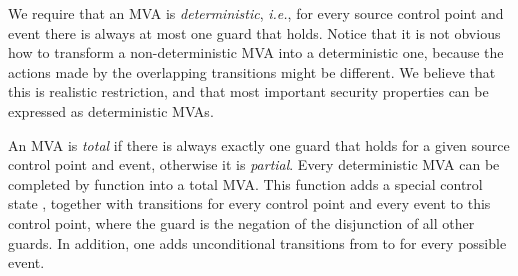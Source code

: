 We require that an MVA is \emph{deterministic}, \emph{i.e.}, for every
source control point and event there is always at most one guard that
holds. Notice that it is not obvious how to transform a
non-deterministic MVA into a deterministic one, because the actions
made by the overlapping transitions might be different. We believe
that this is realistic restriction, and that most important security
properties can be expressed as deterministic MVAs.

An MVA is \emph{total} if there is always exactly one guard that holds
for a given source control point and event, otherwise it is
\emph{partial}. Every deterministic MVA can be completed by function
\complete into a total
MVA. This function adds a special control state
\halted, together with transitions for every control point and every event
to this \halted control point, where the guard is the negation of the
disjunction of all other guards. In addition, one adds unconditional
transitions from \halted to \halted for every possible
event. 


